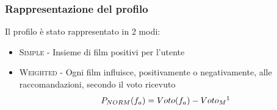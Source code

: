 \documentclass{beamer}
\begin{document}
\begin{frame}
\begin{columns}
\begin{column}{.65\paperwidth}
\end{column}
\end{columns}
\end{frame}


\begin{frame}
\frametitle{Rappresentazione del profilo}
Il profilo è stato rappresentato in 2 modi:
\begin{center}
\begin{itemize}
	\item \textsc{Simple} - Insieme di film positivi per l'utente
	\pause
	\item \textsc{Weighted} - Ogni film influisce, positivamente o negativamente, alle raccomandazioni, secondo il voto ricevuto
$$
P_{NORM}(f_a) = Voto(f_a)- Voto_M\footnote{Valor medio delle votazioni pari a 3}
$$
\end{itemize}
\end{center}

\end{frame}

\end{document}
